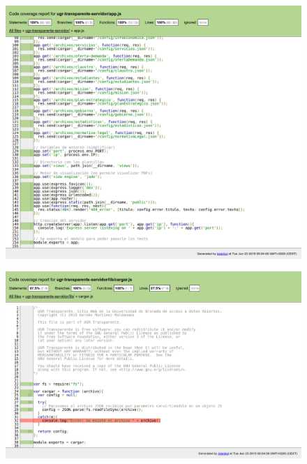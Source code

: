 \begin{figure}[!ht]
	\begin{center}
		\includegraphics[width=1\textwidth]{../images/test_cobertura_02.png}
		\caption{}
		\label{fig:test_cobertura_02}
	\end{center}
\end{figure}

\begin{figure}[!ht]
	\begin{center}
		\includegraphics[width=1\textwidth]{../images/test_cobertura_03.png}
		\caption{}
		\label{fig:test_cobertura_03}
	\end{center}
\end{figure}

